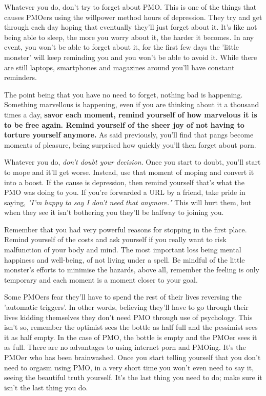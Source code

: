 \documentclass[easypeasy.tex]{subfiles}
\begin{document}
Whatever you do, don't try to forget about PMO. This is one of the things that causes PMOers using the willpower method hours of depression. They try and get through each day hoping that eventually they'll just forget about it. It's like not being able to sleep, the more you worry about it, the harder it becomes. In any event, you won't be able to forget about it, for the first few days the 'little monster' will keep reminding you and you won't be able to avoid it. While there are still laptops, smartphones and magazines around you'll have constant reminders.

The point being that you have no need to forget, nothing bad is happening. Something marvellous is happening, even if you are thinking about it a thousand times a day, \textbf{savor each moment, remind yourself of how marvelous it is to be free again. Remind yourself of the sheer joy of not having to torture yourself anymore.} As said previously, you'll find that pangs become moments of pleasure, being surprised how quickly you'll then forget about porn.

Whatever you do, \textit{don't doubt your decision}. Once you start to doubt, you'll start to mope and it'll get worse. Instead, use that moment of moping and convert it into a boost. If the cause is depression, then remind yourself that's what the PMO was doing to you. If you're forwarded a URL by a friend, take pride in saying, \textit{"I'm happy to say I don't need that anymore."} This will hurt them, but when they see it isn't bothering you they'll be halfway to joining you.

Remember that you had very powerful reasons for stopping in the first place. Remind yourself of the costs and ask yourself if you really want to risk malfunction of your body and mind. The most important loss being mental happiness and well-being, of not living under a spell. Be mindful of the little monster's efforts to minimise the hazards, above all, remember the feeling is only temporary and each moment is a moment closer to your goal.

Some PMOers fear they'll have to spend the rest of their lives reversing the 'automatic triggers'. In other words, believing they'll have to go through their lives kidding themselves they don't need PMO through use of psychology. This isn't so, remember the optimist sees the bottle as half full and the pessimist sees it as half empty. In the case of PMO, the bottle is empty and the PMOer sees it as full. There are no advantages to using internet porn and PMOing. It's the PMOer who has been brainwashed. Once you start telling yourself that you don't need to orgasm using PMO, in a very short time you won't even need to say it, seeing the beautiful truth yourself. It's the last thing you need to do; make sure it isn't the last thing you do.
\end{document}
